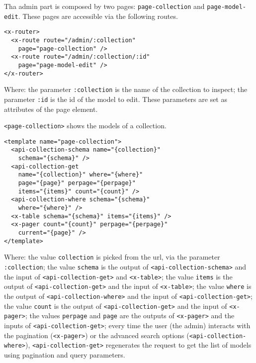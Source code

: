 Tha admin part is composed by two pages: \texttt{page-collection} and \texttt{page-model-edit}.
These pages are accessible via the following routes.

\begin{lstlisting}[language=HTML5]
<x-router>
  <x-route route="/admin/:collection" 
    page="page-collection" />
  <x-route route="/admin/:collection/:id"
    page="page-model-edit" />
</x-router>
\end{lstlisting}

Where:
the parameter \texttt{:collection} is the name of the collection to inspect;
the parameter \texttt{:id} is the id of the model to edit.
These parameters are set as attributes of the page element.

\vspace{0.2cm}

\texttt{<page-collection>} shows the models of a collection.

\begin{lstlisting}[language=HTML5]
<template name="page-collection">
  <api-collection-schema name="{collection}"
    schema="{schema}" />
  <api-collection-get 
    name="{collection}" where="{where}" 
    page="{page}" perpage="{perpage}"  
    items="{items}" count="{count}" />
  <api-collection-where schema="{schema}"
    where="{where}" />
  <x-table schema="{schema}" items="{items}" />
  <x-pager count="{count}" perpage="{perpage}"
    current="{page}" />
</template>
\end{lstlisting}

Where: 
the value \texttt{collection} is picked from the url, via the parameter \texttt{:collection};
the value \texttt{schema} is the output of \texttt{<api-collection-schema>} and the input of \texttt{<api-collection-get>} and \texttt{<x-table>};
the value \texttt{items} is the output of \texttt{<api-collection-get>} and the input of \texttt{<x-table>};
the value \texttt{where} is the output of \texttt{<api-collection-where>} and the input of \texttt{<api-collection-get>};
the value \texttt{count} is the output of \texttt{<api-collection-get>} and the input of \texttt{<x-pager>};
the values \texttt{perpage} and \texttt{page} are the outputs of \texttt{<x-pager>} and the inputs of \texttt{<api-collection-get>};
every time the user (the admin) interacts with the pagination (\texttt{<x-pager>}) or the advanced search options (\texttt{<api-collection-where>}), \texttt{<api-collection-get>} regenerates the request to get the list of models using pagination and query parameters.

